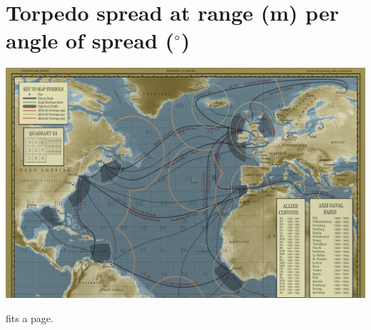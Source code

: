 \documentclass{article}
\newcommand{\degree}{$^{\circ}$}
\begin{document}
\pagebreak

\section{Torpedo spread at range (m) per angle of spread (\degree)}





\includegraphics[angle=90, width=\textwidth]{cmapETO}
\label{GWX Campaign Map}


fits a page.


\end{document}
